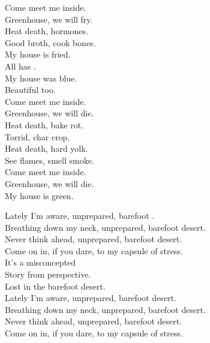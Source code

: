 Come meet me inside. \\
Greenhouse, we will fry. \\

Heat death, hormones. \\
Good broth, cook bones. \\

My house is fried. \\
All  has . \\
My house was blue. \\
Beautiful too. \\

Come meet me inside. \\
Greenhouse, we will die. \\

Heat death, bake rot. \\
Torrid, char crop. \\
Heat death, hard yolk. \\
See flames, smell smoke. \\

Come meet me inside. \\
Greenhouse, we will die. \\

My house is green. \\





Lately I'm aware, unprepared, barefoot . \\
Breathing down my neck, unprepared, barefoot desert. \\
Never think ahead, unprepared, barefoot desert. \\
Come on in, if you dare, to my capsule of stress. \\

It's a misconcepted \\
Story from perspective. \\
Lost in the barefoot desert. \\

Lately I'm aware, unprepared, barefoot desert. \\
Breathing down my neck, unprepared, barefoot desert. \\
Never think ahead, unprepared, barefoot desert. \\
Come on in, if you dare, to my capsule of stress. \\

